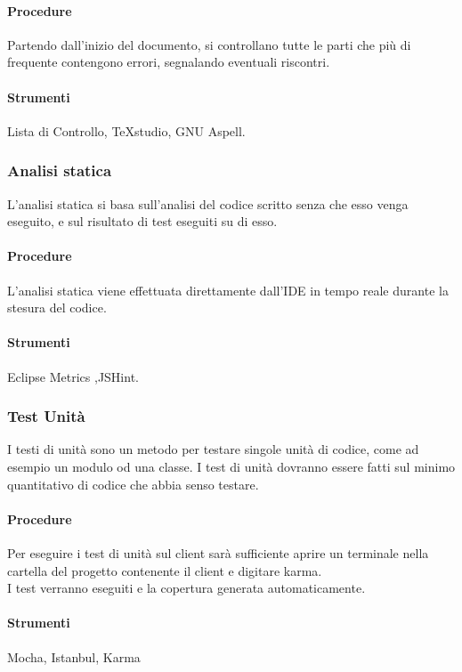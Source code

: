 \paragraph{Procedure}

Partendo dall'inizio del documento, si controllano tutte le parti che più di frequente contengono errori, segnalando eventuali riscontri.
\paragraph{Strumenti}

Lista di Controllo, TeXstudio, GNU Aspell.


\subsubsection{Analisi statica}
L'analisi statica si basa sull'analisi del codice scritto senza che esso venga eseguito, e sul risultato di test eseguiti su di esso.

\paragraph{Procedure}
L'analisi statica viene effettuata direttamente dall'IDE in tempo reale durante la stesura del codice.
\paragraph{Strumenti}
Eclipse Metrics ,JSHint.



\subsubsection{Test Unità}
I testi di unità sono un metodo per testare singole unità di codice, come ad esempio un modulo od una classe. I test di unità dovranno essere fatti sul minimo quantitativo di codice che abbia senso testare.

\paragraph{Procedure}
Per eseguire i test di unità sul client sarà sufficiente aprire un terminale nella cartella del progetto contenente il client e digitare karma.\\
I test verranno eseguiti e la copertura generata automaticamente.
\paragraph{Strumenti}
Mocha, Istanbul, Karma


